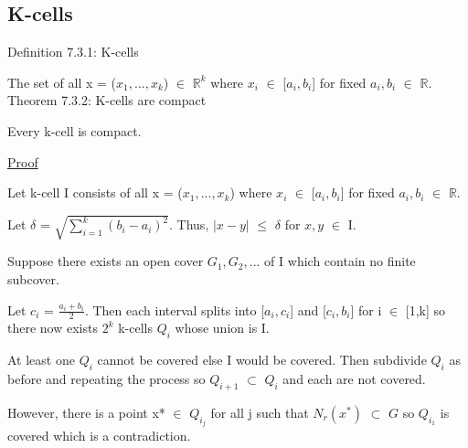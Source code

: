 \subsection{ K-cells } 

{ \color{blue} Definition 7.3.1: K-cells } 

	\begin{adjustbox}{minipage=14cm, right, vspace=0.1cm 0cm}
		The set of all x = ($x_1, ... , x_k$) $\in$ $\mathbb{R}^k$
		where $x_i$ $\in$ [$a_i,b_i$] for fixed $a_i,b_i$ $\in$ $\mathbb{R}$. \\
	\end{adjustbox}

{ \color{red} Theorem 7.3.2: K-cells are compact } 

	\begin{adjustbox}{minipage=14cm, right, vspace=0.1cm 0cm}
		Every k-cell is compact.
	\end{adjustbox}

{ \color{magenta} \underline{Proof} } 

	Let k-cell I consists of all x = ($x_1, ... , x_k$) where
	$x_i$ $\in$ [$a_i,b_i$] for fixed $a_i,b_i$ $\in$ $\mathbb{R}$.

	Let $\delta$ = $\sqrt{\sum_{i=1}^{k} (b_i - a_i)^2}$.
	Thus, $|x-y|$ $\leq$ $\delta$ for $x,y$ $\in$ I.

	Suppose there exists an open cover $G_1, G_2, ...$ of I which
	contain no finite subcover.

	Let $c_i$ = $\frac{a_i+b_i}{2}$.
	Then each interval splits into [$a_i,c_i$] and [$c_i,b_i$]
	for i $\in$ [1,k] so there now exists $2^k$ k-cells $Q_i$
	whose union is I.

	At least one $Q_i$ cannot be covered else I would be covered.
	Then subdivide $Q_i$ as before and repeating the process
	so $Q_{i+1}$ $\subset$ $Q_i$ and each are not covered.

	However, there is a point x* $\in$ $Q_{i_j}$ for all j
	such that $N_r(x^*)$ $\subset$ $G$ so $Q_{i_1}$ is covered
	which is a contradiction. 




